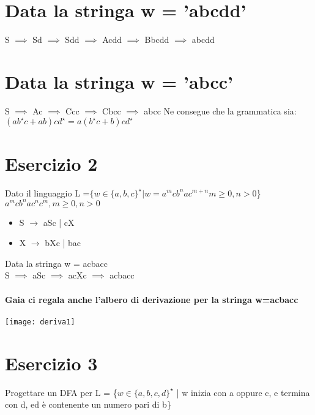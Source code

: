 \documentclass[12pt, a4paper, openany, oneside]{book}
\begin{document}
\section*{Data la stringa w = 'abcdd'}
S $\implies$ Sd $\implies$ Sdd $\implies$ Acdd $\implies$ Bbcdd $\implies$ abcdd
\section*{Data la stringa w = 'abcc'}
S $\implies$ Ac $\implies$ Ccc $\implies$ Cbcc $\implies$ abcc
Ne consegue che la grammatica sia: $(ab^{\star}c + ab) cd^{\star}= a(b^{\star}c+b)cd^{\star}$
\section{Esercizio 2}
Dato il linguaggio L =$ \{w \in \{a, b, c\}^{\star} | w = a^{m}cb^{n}ac^{m+n} m\geq 0,  n>0 $\}
\\ $a^{m}cb^{n}ac^{n}c^{m}, m\geq 0, n>0$\\
\begin{itemize}
	\item S $\to$ aSc | cX 
	\item X $\to$ bXc | bac
\end{itemize} 
Data la stringa w = acbacc\\
S $\implies$ aSc $\implies$ acXc $\implies$ acbacc
\paragraph{Gaia ci regala anche l'albero di derivazione per la stringa w=acbacc}
\begin{center}
\texttt{[image: deriva1]}
\end{center}
\section{Esercizio 3}
Progettare un DFA per L = \{$w \in \{a, b, c, d\}^{\star}$ | w inizia con a oppure
c, e termina con d, ed è contenente un numero pari di b\} 
\end{document}
